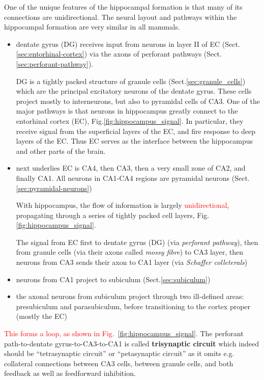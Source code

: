 One of the unique features of the hippocampal formation is that many of its
connections are unidirectional. The neural layout and pathways within the
hippocampal formation are very similar in all mammals.
\begin{itemize}
  \item dentate gyrus (DG) receives input from neurons in layer II of EC
  (Sect.\ref{sec:entorhinal-cortex}) via the axons of perforant pathways
  (Sect.\ref{sec:perforant-pathway}).
  
  DG is a tightly packed structure of granule cells
  (Sect.\ref{sec:granule_cells}) which are the  principal excitatory neurons of
  the dentate gyrus.
  These cells project mostly to interneurons, but also to pyramidal cells of
  CA3. One of the major pathways is that neurons in hippocampus greatly connect
  to the
entorhinal cortex (EC), Fig.\ref{fig:hippocampus_signal}.  In particular, they
receive signal from the superficial layers of the EC, and fire response to deep
layers of the EC. Thus EC serves as the interface between the hippocampus and
other parts of the brain.

  \item next underlies EC is CA4, then CA3, then a very small zone of CA2, and
  finally CA1. All neurons in CA1-CA4 regions are pyramidal neurons
  (Sect.\ref{sec:pyramidal-neurons})

With hippocampus, the flow of information is largely
\textcolor{red}{unidirectional}, propagating through a series of tightly packed
cell layers,   Fig.\ref{fig:hippocampus_signal}.

The signal from EC first to dentate gyrus
  (DG) (via {\it perforant pathway}), then from granule cells (via their axons
  called  {\it mossy fibre}) to CA3 layer, then neurons from CA3 sends their
  axon  to CA1 layer (via {\it Schaffer colleterals})
%   
       
  \item neurons from CA1 project to subiculum (Sect.\ref{sec:subiculum})
  
  \item the axonal neurons from subiculum project through two ill-defined areas:
  presubiculum and parasubiculum, before transitioning to the cortex proper
  (mostly the EC)
\end{itemize}
\textcolor{red}{This forms a loop, as shown in
Fig.~\ref{fig:hippocampus_signal}.} The perforant path-to-dentate
gyrus-to-CA3-to-CA1 is called {\bf trisynaptic circuit} which indeed should be
``tetrasynaptic circuit'' or ``petasynaptic circuit'' as it omits e.g.
collateral connections between CA3 cells, between granule cells, and both
feedback as well as feedforward inhibition.


